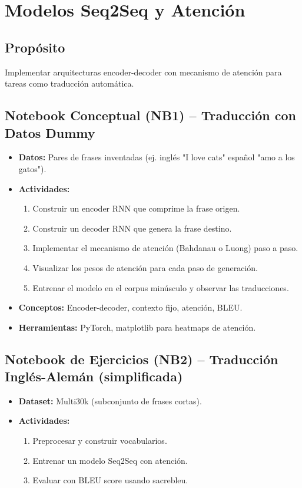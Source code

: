 \documentclass[12pt,a4paper]{article}
\begin{document}
\section{Modelos Seq2Seq y Atención}
\subsection*{Propósito}
Implementar arquitecturas encoder-decoder con mecanismo de atención para tareas como traducción automática.

\subsection*{Notebook Conceptual (NB1) – Traducción con Datos Dummy}
\begin{itemize}
    \item \textbf{Datos:} Pares de frases inventadas (ej. inglés "I love cats" \rightarrow español "amo a los gatos").
    \item \textbf{Actividades:}
    \begin{enumerate}
        \item Construir un encoder RNN que comprime la frase origen.
        \item Construir un decoder RNN que genera la frase destino.
        \item Implementar el mecanismo de atención (Bahdanau o Luong) paso a paso.
        \item Visualizar los pesos de atención para cada paso de generación.
        \item Entrenar el modelo en el corpus minúsculo y observar las traducciones.
    \end{enumerate}
    \item \textbf{Conceptos:} Encoder-decoder, contexto fijo, atención, BLEU.
    \item \textbf{Herramientas:} PyTorch, matplotlib para heatmaps de atención.
\end{itemize}

\subsection*{Notebook de Ejercicios (NB2) – Traducción Inglés-Alemán (simplificada)}
\begin{itemize}
    \item \textbf{Dataset:} Multi30k (subconjunto de frases cortas).
    \item \textbf{Actividades:}
    \begin{enumerate}
        \item Preprocesar y construir vocabularios.
        \item Entrenar un modelo Seq2Seq con atención.
        \item Evaluar con BLEU score usando sacrebleu.
    \end{enumerate}
\end{itemize}
\end{document}
